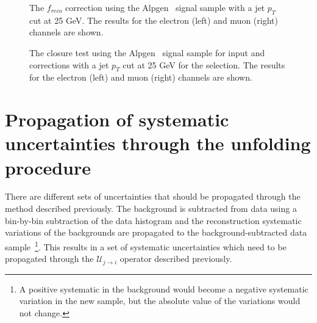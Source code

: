 \begin{figure}[htbp]
\centering
{}
\caption{The $f_{reco}$ correction using the Alpgen  \ttbar\ signal sample with a jet $p_T$ cut at 25 GeV.  The results for the electron (left) and muon (right) channels are shown.}
\label{fig:MethodBfreco}
\end{figure}

\begin{sidewaysfigure}[htbp]
\centering
{}
\caption{The closure test using the Alpgen  \ttbar\ signal sample for input and corrections with a jet $p_T$
  cut at 25 GeV for the selection.  The
  results for the electron (left) and muon (right) channels are shown.}
\label{fig:MethodBclosure}
\end{sidewaysfigure}

\section{Propagation of systematic uncertainties through the unfolding procedure}
\label{sec:ttjets_unfold_unc}

There are different sets of uncertainties that should be propagated through the method described previously.
The background is subtracted from data using a bin-by-bin subtraction of the data histogram and the reconstruction systematic variations of the backgrounds
are propagated to the background-subtracted data sample~\footnote{A positive systematic in the background would become a negative systematic variation in the new sample,
but the absolute value of the variations would not change.}. This results in a set of systematic uncertainties which need to be
propagated through the $\mathcal{U}_{j \rightarrow i}$ operator described previously.

